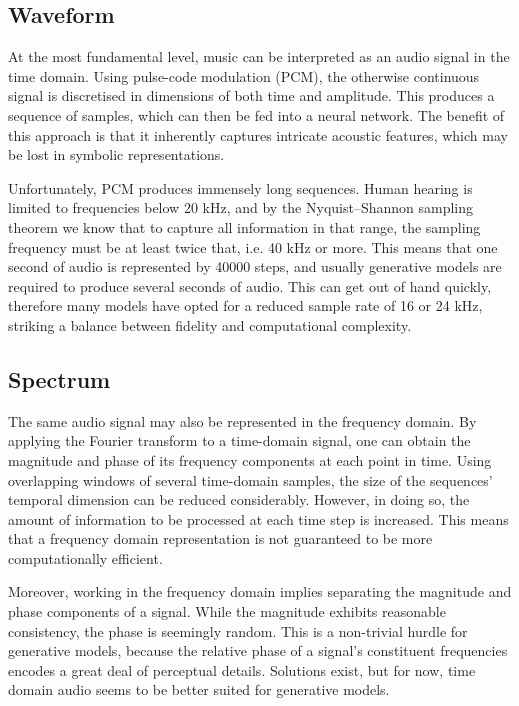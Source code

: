 \documentclass[../../report.tex]{subfiles}
\begin{document}

\subsection{Waveform}

At the most fundamental level, music can be interpreted as an audio signal in
the time domain. Using pulse-code modulation (PCM), the otherwise continuous
signal is discretised in dimensions of both time and amplitude. This produces a
sequence of samples, which can then be fed into a neural network. The benefit of
this approach is that it inherently captures intricate acoustic features, which
may be lost in symbolic representations. \cite{Dieleman2020}

Unfortunately, PCM produces immensely long sequences. Human hearing is limited
to frequencies below \num{20} kHz, and by the Nyquist--Shannon sampling theorem
we know that to capture all information in that range, the sampling frequency
must be at least twice that, i.e. \num{40} kHz or more. This means that one
second of audio is represented by \num{40000} steps, and usually generative
models are required to produce several seconds of audio. This can get out of
hand quickly, therefore many models have opted for a reduced sample rate of
\num{16} or \num{24} kHz, striking a balance between fidelity and computational
complexity. \cite{Dieleman2020}


\subsection{Spectrum}

The same audio signal may also be represented in the frequency domain. By
applying the Fourier transform to a time-domain signal, one can obtain the
magnitude and phase of its frequency components at each point in time. Using
overlapping windows of several time-domain samples, the size of the sequences'
temporal dimension can be reduced considerably. However, in doing so, the amount
of information to be processed at each time step is increased. This means that a frequency
domain representation is not guaranteed to be more computationally efficient.
\cite{Dieleman2020}

Moreover, working in the frequency domain implies separating the
magnitude and phase components of a signal. While the magnitude exhibits
reasonable consistency, the phase is seemingly random. This is a non-trivial
hurdle for generative models, because the relative phase of a signal's
constituent frequencies encodes a great deal of perceptual details. Solutions
exist, but for now, time domain audio seems to be better suited for generative
models. \cite{Dieleman2020}


\end{document}
